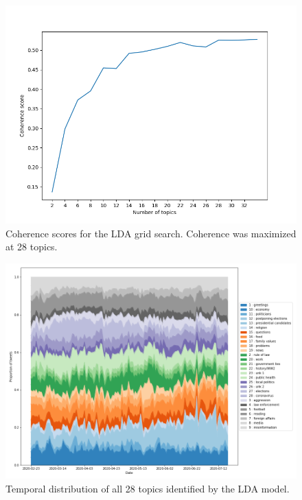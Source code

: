 \documentclass{article}
\begin{document}
	\begin{figure}[!h]
		\centering
		\includegraphics[width=\columnwidth]{figures/coherence_grid.png}
		\caption{Coherence scores for the LDA grid search. Coherence was maximized at 28 topics.}
		\label{fig:coherence_grid}
	\end{figure}


	\begin{figure}[!h]
		\centering
		\includegraphics[width=\columnwidth]{figures/temp_dist_all.png}
		\caption{Temporal distribution of all 28 topics identified by the LDA model.}
		\label{fig:topics_time_all }
	\end{figure}

	\FloatBarrier
	
\end{document}
